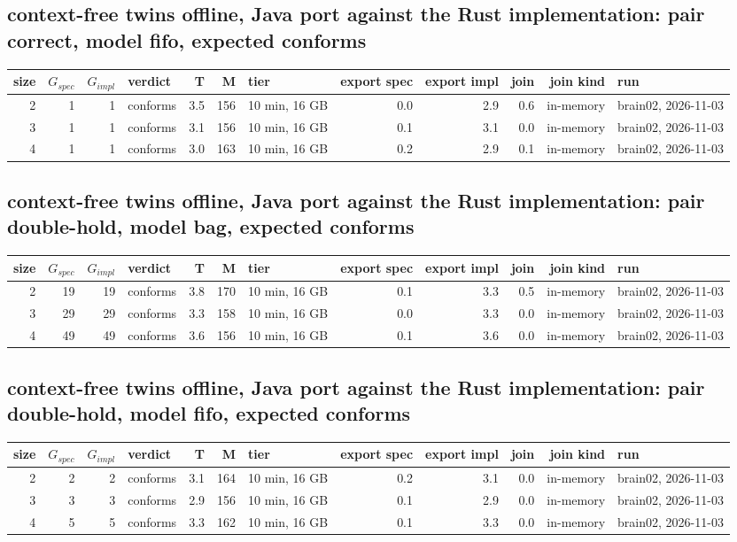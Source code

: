 \documentclass[10pt]{article}
\begin{document}
\subsection*{context-free twins offline, Java port against the Rust implementation: pair \textsf{correct}, model fifo, expected conforms}
\begin{longtable}{@{}rrrlrrlrrrrl@{}}
\toprule
size & $G_{\mathit{spec}}$ & $G_{\mathit{impl}}$ & verdict & T & M & tier & export spec & export impl & join & join kind & run \\
\midrule
\endhead
\color{red} 2 & 1 & 1 & conforms & 3.5 & 156 & 10 min, 16 GB & 0.0 & 2.9 & 0.6 & in-memory & brain02, 2026-11-03 \\
\color{red} 3 & 1 & 1 & conforms & 3.1 & 156 & 10 min, 16 GB & 0.1 & 3.1 & 0.0 & in-memory & brain02, 2026-11-03 \\
\color{red} 4 & 1 & 1 & conforms & 3.0 & 163 & 10 min, 16 GB & 0.2 & 2.9 & 0.1 & in-memory & brain02, 2026-11-03 \\
\bottomrule
\end{longtable}
\subsection*{context-free twins offline, Java port against the Rust implementation: pair \textsf{double-hold}, model bag, expected conforms}
\begin{longtable}{@{}rrrlrrlrrrrl@{}}
\toprule
size & $G_{\mathit{spec}}$ & $G_{\mathit{impl}}$ & verdict & T & M & tier & export spec & export impl & join & join kind & run \\
\midrule
\endhead
\color{red} 2 & 19 & 19 & conforms & 3.8 & 170 & 10 min, 16 GB & 0.1 & 3.3 & 0.5 & in-memory & brain02, 2026-11-03 \\
\color{red} 3 & 29 & 29 & conforms & 3.3 & 158 & 10 min, 16 GB & 0.0 & 3.3 & 0.0 & in-memory & brain02, 2026-11-03 \\
\color{red} 4 & 49 & 49 & conforms & 3.6 & 156 & 10 min, 16 GB & 0.1 & 3.6 & 0.0 & in-memory & brain02, 2026-11-03 \\
\bottomrule
\end{longtable}
\subsection*{context-free twins offline, Java port against the Rust implementation: pair \textsf{double-hold}, model fifo, expected conforms}
\begin{longtable}{@{}rrrlrrlrrrrl@{}}
\toprule
size & $G_{\mathit{spec}}$ & $G_{\mathit{impl}}$ & verdict & T & M & tier & export spec & export impl & join & join kind & run \\
\midrule
\endhead
\color{red} 2 & 2 & 2 & conforms & 3.1 & 164 & 10 min, 16 GB & 0.2 & 3.1 & 0.0 & in-memory & brain02, 2026-11-03 \\
\color{red} 3 & 3 & 3 & conforms & 2.9 & 156 & 10 min, 16 GB & 0.1 & 2.9 & 0.0 & in-memory & brain02, 2026-11-03 \\
\color{red} 4 & 5 & 5 & conforms & 3.3 & 162 & 10 min, 16 GB & 0.1 & 3.3 & 0.0 & in-memory & brain02, 2026-11-03 \\
\bottomrule
\end{longtable}
\end{document}
